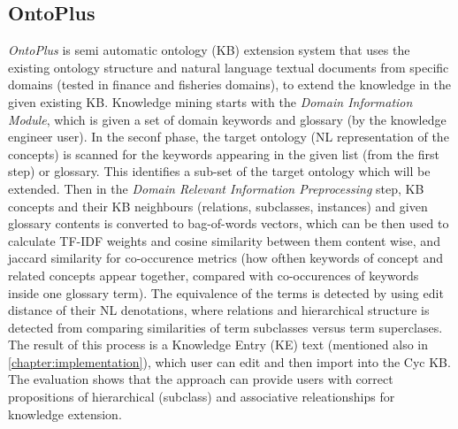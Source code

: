 \subsection{OntoPlus}
\label{section:r:ontoplus}
\emph{OntoPlus} is semi automatic ontology (KB) extension system that uses the 
existing ontology structure and natural language textual documents from specific
domains (tested in finance and fisheries domains), to extend the knowledge in 
the given existing KB\parencite{Novalija2011}. Knowledge mining starts with
the \emph{Domain Information Module}, which is given a set of domain keywords
and glossary (by the knowledge engineer user). In the seconf phase, the target
ontology (NL representation of the concepts) is scanned for the keywords
appearing in the given list (from the first step) or glossary. This identifies
a sub-set of the target ontology which will be extended.
Then in the \emph{Domain Relevant Information Preprocessing} step, KB concepts
and their KB neighbours (relations, subclasses, instances) and given glossary 
contents is converted to bag-of-words vectors, which can be then used to
calculate TF-IDF weights and cosine similarity between them content wise, and
jaccard similarity for co-occurence metrics (how ofthen keywords of concept and
related concepts appear together, compared with co-occurences of keywords
inside one glossary term). The equivalence of the terms is detected by
using edit distance of their NL denotations, where relations and hierarchical
structure is detected from comparing similarities of term subclasses versus
term superclases. The result of this process is a Knowledge Entry (KE) text
(mentioned also in \autoref{chapter:implementation}), which user can edit and 
then import into the Cyc KB. The evaluation shows that the approach can provide
users with correct propositions of hierarchical (subclass) and associative
releationships for knowledge extension.

